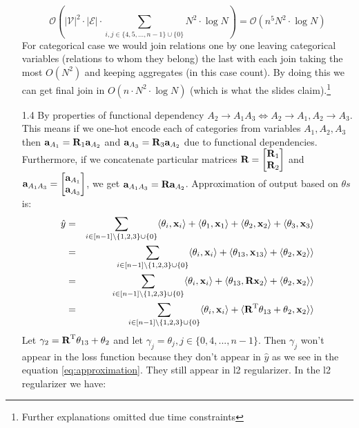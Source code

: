 \documentclass[10pt,a4paper]{article}
\begin{document}
\begin{enumerate}
 $$
\mathcal{O}\left(|\mathcal{V}|^{2} \cdot|\mathcal{E}| \cdot \sum_{i, j \in \{4, 5, ..., n-1\}\cup\{0\}}N^{\mathrm{2}}\cdot \log N\right) = \mathcal{O}\left(n^5 N^{\mathrm{2}}\cdot \log N\right)
 $$
 For categorical case we would join relations one by one leaving categorical variables (relations to whom they belong) the last with each join taking the most $O(N^2)$ and keeping aggregates (in this case count).  By doing this we can get final join in $O(n \cdot N^2 \cdot \log N)$ (which is what the slides claim).\footnote{Further explanations omitted due time constraints}
\item [1.4]
By properties of functional dependency $A_2 \rightarrow A_1A_3 \Leftrightarrow A_2 \rightarrow A_1, A_2\rightarrow A_3$. This means if we one-hot encode each of categories from variables $A_1, A_2, A_3$ then $\textbf{\text{{a}}}_{A_1} = \textbf{\text{{R}}}_1 \textbf{\text{{a}}}_{A_2}$ and $\textbf{\text{{a}}}_{A_3} = \textbf{\text{{R}}}_3 \textbf{\text{{a}}}_{A_2}$ due to functional dependencies. Furthermore, if we concatenate particular matrices $\textbf{\text{{R}}}= \begin{bmatrix}
\textbf{\text{{R}}}_1 \\
\textbf{\text{{R}}}_2
\end{bmatrix}
$  
and 
$\textbf{\text{{a}}}_{A_1A_3}= \begin{bmatrix}
\textbf{\text{{a}}}_{A_1} \\
\textbf{\text{{a}}}_{A_3}
\end{bmatrix}
$, we get $\textbf{\text{{a}}}_{A_1A_3}=\textbf{\text{{R}}}\textbf{\text{{a}}}_{A_2}$. Approximation of output based on $\theta s$ is:
\begin{eqnarray}
\hat{y} &=& 
\sum_{ i\in [n-1] \setminus \{ 1, 2,3 \} \cup \{0\}} \langle \theta_i, \textbf{\text{{x}}}_i \rangle + \langle \theta_1 , \textbf{\text{{x}}}_1 \rangle  + \langle \theta_2 , \textbf{\text{{x}}}_2 \rangle + \langle \theta_3, \textbf{\text{{x}}}_3 \rangle\\
&=&
\sum_{ i\in [n-1] \setminus \{ 1, 2,3 \} \cup \{0\}} \langle \theta_i, \textbf{\text{{x}}}_i \rangle + \langle \theta_{13},\textbf{\text{{x}}}_{13} \rangle  + \langle \theta_2, \textbf{\text{{x}}}_2 \rangle \rangle\\
&=&
\sum_{ i\in [n-1] \setminus \{ 1, 2,3 \}\cup \{0\}} \langle \theta_i, \textbf{\text{{x}}}_i \rangle + \langle \theta_{13},\textbf{\text{{R}}} \textbf{\text{{x}}}_2 \rangle  + \langle \theta_2 ,\textbf{\text{{x}}}_2 \rangle \rangle\\
&=&
\sum_{ i\in [n-1]\setminus \{ 1, 2,3 \} \cup \{0\}} \langle \theta_i, \textbf{\text{{x}}}_i \rangle +   \langle \textbf{\text{{R}}} ^ \text{T} \theta_{13} +\theta_2 ,\textbf{\text{{x}}}_2 \rangle \rangle \label{eq:approximation}\\
\end{eqnarray}
Let $\gamma_2 = \textbf{\text{{R}}} ^ \text{T}\theta_{13} + \theta_2$ and let $\gamma_j = \theta_j, j \in \{0, 4, ..., n-1\}$. Then $\gamma_j$ won't appear in the loss function because they don't appear in $\hat{y}$ as we see in the equation \ref{eq:approximation}. They still appear in l2 regularizer. In the l2 regularizer we have:

\end{enumerate}
\end{document}
